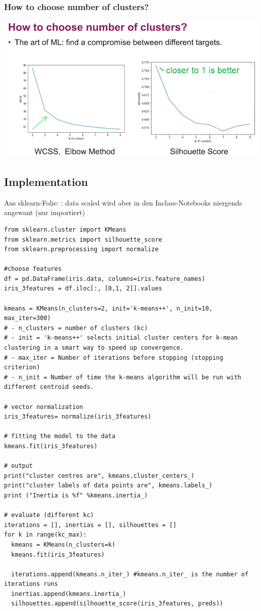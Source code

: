 \subsubsection{How to choose number of clusters?}
\includegraphics[width=\linewidth]{./img/w12_choose_nof_clusters.png}

\subsection{Implementation}
Aus sklearn-Folie:  : data scaled wird aber in den Inclass-Notebooks niergends angewant (nur importiert)

\begin{verbatim}
from sklearn.cluster import KMeans 
from sklearn.metrics import silhouette_score
from sklearn.preprocessing import normalize

#choose features
df = pd.DataFrame(iris.data, columns=iris.feature_names)
iris_3features = df.iloc[:, [0,1, 2]].values

kmeans = KMeans(n_clusters=2, init='k-means++', n_init=10, max_iter=300)
# - n_clusters = number of clusters (kc)
# - init = 'k-means++' selects initial cluster centers for k-mean clustering in a smart way to speed up convergence. 
# - max_iter = Number of iterations before stopping (stopping criterion)
# - n_init = Number of time the k-means algorithm will be run with different centroid seeds. 

# vector normalization
iris_3features= normalize(iris_3features)

# fitting the model to the data
kmeans.fit(iris_3features)

# output
print("cluster centres are", kmeans.cluster_centers_)
print("cluster labels of data points are", kmeans.labels_)
print ("Inertia is %f" %kmeans.inertia_)

# evaluate (different kc)
iterations = [], inertias = [], silhouettes = []
for k in range(kc_max):
  kmeans = KMeans(n_clusters=k)
  kmeans.fit(iris_3features)
  
  iterations.append(kmeans.n_iter_) #kmeans.n_iter_ is the number of iterations runs
  inertias.append(kmeans.inertia_)
  silhouettes.append(silhouette_score(iris_3features, preds))
\end{verbatim}